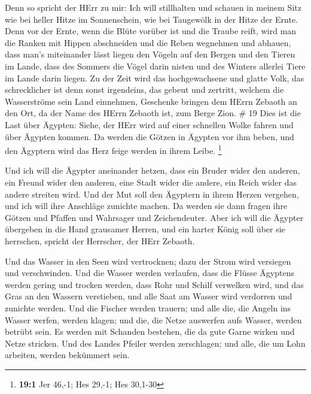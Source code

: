  Denn so spricht der HErr zu mir: Ich will stillhalten und
schauen in meinem Sitz wie bei heller Hitze im Sonnenschein, wie bei
Taugewölk in der Hitze der Ernte.  Denn vor der Ernte, wenn
die Blüte vorüber ist und die Traube reift, wird man die Ranken mit
Hippen abschneiden und die Reben wegnehmen und abhauen, 
dass man's miteinander lässt liegen den Vögeln auf den Bergen und den
Tieren im Lande, dass des Sommers die Vögel darin nisten und des Winters
allerlei Tiere im Lande darin liegen.  Zu der Zeit wird das
hochgewachsene und glatte Volk, das schrecklicher ist denn sonst
irgendeins, das gebeut und zertritt, welchem die Wasserströme sein Land
einnehmen, Geschenke bringen dem HErrn Zebaoth an den Ort, da der Name
des HErrn Zebaoth ist, zum Berge Zion. \# 19  Dies ist die
Last über Ägypten: Siehe, der HErr wird auf einer schnellen Wolke fahren
und über Ägypten kommen. Da werden die Götzen in Ägypten vor ihm beben,
und den Ägyptern wird das Herz feige werden in ihrem Leibe. \footnote{\textbf{19:1}
  Jer 46,-1; Hes 29,-1; Hes 30,1-30}

 Und ich will die Ägypter aneinander hetzen, dass ein Bruder
wider den anderen, ein Freund wider den anderen, eine Stadt wider die
andere, ein Reich wider das andere streiten wird.  Und der
Mut soll den Ägyptern in ihrem Herzen vergehen, und ich will ihre
Anschläge zunichte machen. Da werden sie dann fragen ihre Götzen und
Pfaffen und Wahrsager und Zeichendeuter.  Aber ich will die
Ägypter übergeben in die Hand grausamer Herren, und ein harter König
soll über sie herrschen, spricht der Herrscher, der HErr Zebaoth.

 Und das Wasser in den Seen wird vertrocknen; dazu der Strom
wird versiegen und verschwinden.  Und die Wasser werden
verlaufen, dass die Flüsse Ägyptens werden gering und trocken werden,
dass Rohr und Schilf verwelken wird,  und das Gras an den
Wassern verstieben, und alle Saat am Wasser wird verdorren und zunichte
werden.  Und die Fischer werden trauern; und alle die, die
Angeln ins Wasser werfen, werden klagen; und die, die Netze auswerfen
aufs Wasser, werden betrübt sein.  Es werden mit Schanden
bestehen, die da gute Garne wirken und Netze stricken.  Und
des Landes Pfeiler werden zerschlagen; und alle, die um Lohn arbeiten,
werden bekümmert sein.


